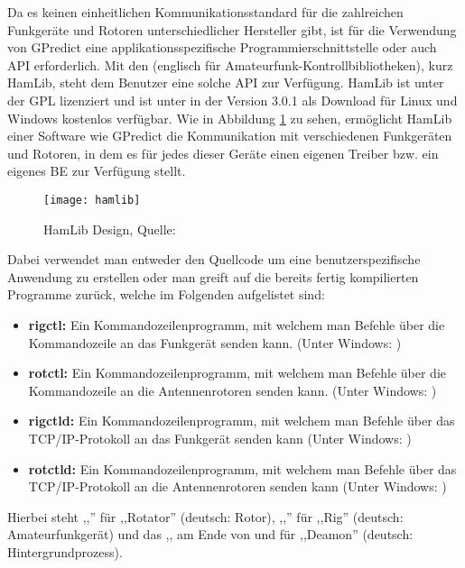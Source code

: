 Da es keinen einheitlichen Kommunikationsstandard für die zahlreichen Funkgeräte und Rotoren unterschiedlicher Hersteller gibt, ist für die Verwendung von GPredict eine applikationsspezifische Programmierschnittstelle oder auch \ac{API} erforderlich. Mit den  (englisch für Amateurfunk-Kontrollbibliotheken), kurz HamLib, steht dem Benutzer eine solche \ac{API} zur Verfügung. HamLib ist unter der \ac{GPL} lizenziert und ist unter \cite{hamlibdownload} in der Version 3.0.1 als Download für Linux und Windows kostenlos verfügbar. Wie in Abbildung \ref{fig:hamlib} zu sehen, ermöglicht HamLib einer Software wie GPredict die Kommunikation mit verschiedenen Funkgeräten und Rotoren, in dem es für jedes dieser Geräte einen eigenen Treiber bzw. ein eigenes \ac{BE} zur Verfügung stellt.

\begin{figure}[h]
	\centering
	\texttt{[image: hamlib]}
	\caption{HamLib Design, Quelle: \cite{hamlibmanual}}
	\label{fig:hamlib} 
\end{figure}

Dabei verwendet man entweder den Quellcode um eine benutzerspezifische Anwendung zu erstellen oder man greift auf die bereits fertig kompilierten Programme zurück, welche im Folgenden aufgelistet sind:

\begin{itemize}
	\parskip0pt
	\item \textbf{rigctl:} Ein Kommandozeilenprogramm, mit welchem man Befehle über die Kommandozeile an das Funkgerät senden kann. (Unter Windows: )
	\item \textbf{rotctl:} Ein Kommandozeilenprogramm, mit welchem man Befehle über die Kommandozeile an die Antennenrotoren senden kann. (Unter Windows: )
	\item \textbf{rigctld:} Ein Kommandozeilenprogramm, mit welchem man Befehle über das TCP/IP-Protokoll an das Funkgerät senden kann (Unter Windows: )
	\item \textbf{rotctld:}  Ein Kommandozeilenprogramm, mit welchem man Befehle über das TCP/IP-Protokoll an die Antennenrotoren senden kann (Unter Windows: )
\end{itemize}

Hierbei steht ,,'' für ,,Rotator'' (deutsch: Rotor), ,,'' für  ,,Rig'' (deutsch: Amateurfunkgerät) und das ,, am Ende von  und  für ,,Deamon'' (deutsch: Hintergrundprozess).



